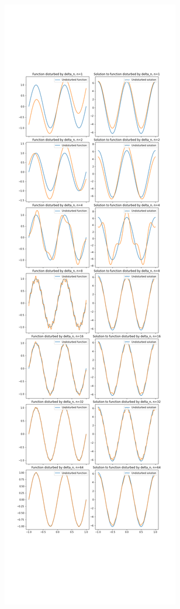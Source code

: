 \documentclass[10pt]{article}
\begin{document}
	\begin{figure}[h]
	 	\includegraphics[width=.5\textwidth]{Disturbed solution 2.png}
	\end{figure}	
	
	
	

	
	\bigskip
	
	
	
	
\end{document}
